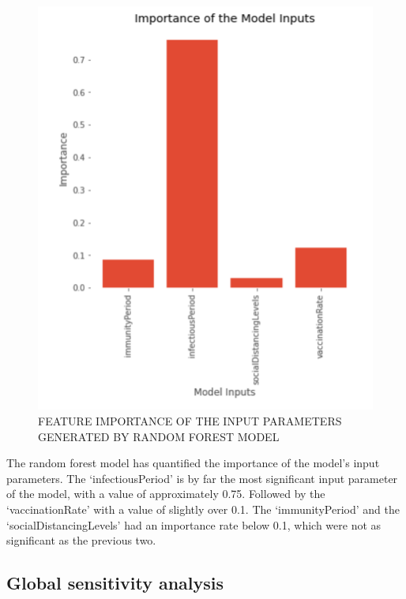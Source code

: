 \documentclass[smallextended]{svjour3}       %
\begin{document}
\begin{figure}
	\centering
	\includegraphics[width=0.5\linewidth]{figures/randomForest.png}
	\caption{FEATURE IMPORTANCE OF THE INPUT PARAMETERS GENERATED BY RANDOM FOREST MODEL\label{fig:randomForest}}
\end{figure}


The random forest model has quantified the importance of the model’s input parameters. The ‘infectiousPeriod’ is by far the most significant input parameter of the model, with a value of approximately 0.75. Followed by the ‘vaccinationRate’ with a value of slightly over 0.1. The ‘immunityPeriod’ and the ‘socialDistancingLevels’ had an importance rate below 0.1, which were not as significant as the previous two.


\subsection{Global sensitivity analysis}


\end{document}
